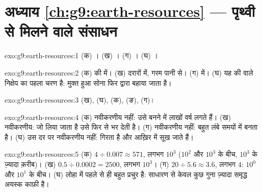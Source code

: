 \section*{अध्याय \ref{ch:g9:earth-resources} --- पृथ्वी से मिलने वाले संसाधन}

\begin{solution}{exo:g9:earth-resources:1}
(क) । (ख) । (ग) । (घ) ।
\end{solution}

\begin{solution}{exo:g9:earth-resources:2}
(क)  की  में। (ख) दरारों में, गरम पानी से। (ग)  में।
(घ) यह  की  वाले निक्षेप का पहला चरण है: मुक्त हुआ सोना फिर  द्वारा बहाया
जाता है।
\end{solution}

\begin{solution}{exo:g9:earth-resources:3}
(ख), (घ), (क), (ङ), (ग)।
\end{solution}

\begin{solution}{exo:g9:earth-resources:4}
(क) नवीकरणीय नहीं: उसे बनने में लाखों वर्ष लगते हैं। (ख) नवीकरणीय: जो लिया जाता है उसे
 फिर से भर देती है। (ग) नवीकरणीय नहीं:  बहुत लंबे समयों में बनता है।
(घ) उस दर पर नवीकरणीय नहीं:  गिरता है और  आख़िर में सूख जाते
हैं।
\end{solution}

\begin{solution}{exo:g9:earth-resources:5}
(क) $4 \div 0.007 \approx 571$, लगभग $10^3$ ($10^2$ और $10^3$ के बीच,
$10^3$ के ज़्यादा क़रीब)। (ख) $0.5 \div 0.0002 = 2500$, लगभग $10^3$। (ग) $20
\div 5.6 \approx 3.6$, लगभग 4: $10^0$ और $10^1$ के बीच।
(घ) लोहा  में पहले से ही बहुत प्रचुर है: साधारण  से केवल कुछ गुना ज़्यादा समृद्ध
अयस्क काफ़ी है।
\end{solution}

